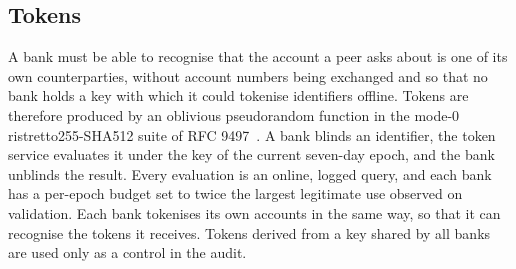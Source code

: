 \documentclass[conference]{IEEEtran}
\begin{document}
\subsection{Tokens}
A bank must be able to recognise that the account a peer asks about is one of its own
counterparties, without account numbers being exchanged and so that no bank holds a key
with which it could tokenise identifiers offline. Tokens are therefore produced by an
oblivious pseudorandom function in the mode-0 ristretto255-SHA512 suite of RFC
9497~\cite{rfc9497}. A bank blinds an identifier, the token service evaluates it under the
key of the current seven-day epoch, and the bank unblinds the result. Every evaluation is an
online, logged query, and each bank has a per-epoch budget set to twice the largest
legitimate use observed on validation. Each bank tokenises its own accounts in the same way, so
that it can recognise the tokens it receives. Tokens derived from a key shared by all banks
are used only as a control in the audit.
\end{document}
